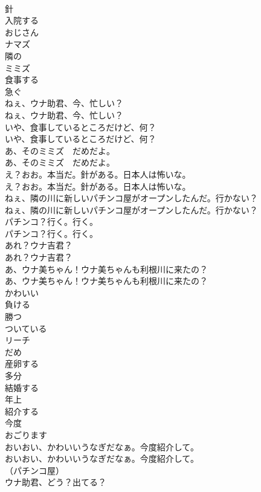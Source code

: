 \documentclass[8pt]{extreport}
\begin{document}
\begin{CJK}{UTF8}{min}
\\	針
\\	入院する
\\	おじさん
\\	ナマズ
\\	隣の
\\	ミミズ
\\	食事する
\\	急ぐ
\\	ねぇ、ウナ助君、今、忙しい？	
\\	ねぇ、ウナ助君、今、忙しい？ 
\\	いや、食事しているところだけど、何？	
\\	いや、食事しているところだけど、何？ 
\\	あ、そのミミズ　だめだよ。	
\\	あ、そのミミズ　だめだよ。 
\\	え？おお。本当だ。針がある。日本人は怖いな。	
\\	え？おお。本当だ。針がある。日本人は怖いな。 
\\	ねぇ、隣の川に新しいパチンコ屋がオープンしたんだ。行かない？	
\\	ねぇ、隣の川に新しいパチンコ屋がオープンしたんだ。行かない？ 
\\	パチンコ？行く。行く。	
\\	パチンコ？行く。行く。 
\\	あれ？ウナ吉君？	
\\	あれ？ウナ吉君？ 
\\	あ、ウナ美ちゃん！ウナ美ちゃんも利根川に来たの？	
\\	あ、ウナ美ちゃん！ウナ美ちゃんも利根川に来たの？ 
\\	かわいい
\\	負ける
\\	勝つ
\\	ついている
\\	リーチ
\\	だめ
\\	産卵する
\\	多分
\\	結婚する
\\	年上
\\	紹介する
\\	今度
\\	おごります
\\	おいおい、かわいいうなぎだなぁ。今度紹介して。	
\\	おいおい、かわいいうなぎだなぁ。今度紹介して。 
\\	（パチンコ屋）	
\\	ウナ助君、どう？出てる？	

\end{CJK}
\end{document}
